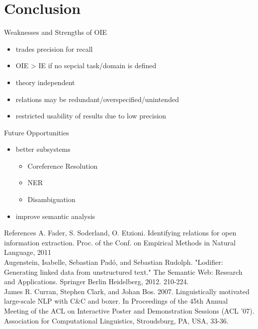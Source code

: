 \documentclass[11pt]{beamer}
\begin{document}
\section{Conclusion}
	\begin{frame}{Weaknesses and Strengths of OIE}
		\begin{itemize}
			\item trades precision for recall
			\item OIE > IE if no sepcial task/domain is defined
			\item theory independent
			\item relations may be redundant/overspecified/unintended
			\item restricted usability of results due to low precision
		\end{itemize}
	\end{frame}
	\begin{frame}{Future Opportunities}
		\begin{itemize}
			\item better subsystems\\
				\begin{itemize}
					\item Coreference Resolution
					\item NER
					\item Disambiguation
				\end{itemize}
			\item improve semantic analysis
		\end{itemize}
	\end{frame}
	
	\begin{frame}[allowframebreaks]{References}
		A. Fader, S. Soderland, O. Etzioni. Identifying relations for open information extraction. Proc. of the Conf. on Empirical Methods in Natural Language, 2011\\
		\vspace{7pt}
		Augenstein, Isabelle, Sebastian Padó, and Sebastian Rudolph. "Lodifier: Generating linked data from unstructured text." The Semantic Web: Research and Applications. Springer Berlin Heidelberg, 2012. 210-224.\\
		\framebreak
		James R. Curran, Stephen Clark, and Johan Bos. 2007. Linguistically motivated large-scale NLP with C\&C and boxer. In Proceedings of the 45th Annual Meeting of the ACL on Interactive Poster and Demonstration Sessions (ACL '07). Association for Computational Linguistics, Stroudsburg, PA, USA, 33-36.\\
		\vspace{7pt}
	\end{frame}
\end{document}
